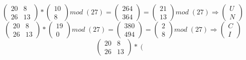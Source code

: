 \documentclass{article}
\begin{document}
\begin{enumerate}
\begin{equation*}
    \left(
    \begin{array}{cc}
    20 & 8 \\
    26 & 13
    \end{array}
    \right) *
    \left(
    \begin{array}{c}
    10\\
    8
    \end{array}
    \right) mod \;(27) = \left(
    \begin{array}{c}
    264\\
    364
    \end{array}
    \right) = \left(
    \begin{array}{c}
    21 \\
    13
    \end{array}
    \right) mod \;(27) \Rightarrow \left(
    \begin{array}{c}
    U\\
    N
    \end{array}
    \right)
\end{equation*}
\begin{equation*}
    \left(
    \begin{array}{cc}
    20 & 8 \\
    26 & 13
    \end{array}
    \right) *
    \left(
    \begin{array}{c}
    19\\
    0
    \end{array}
    \right) mod \;(27) = \left(
    \begin{array}{c}
    380\\
    494
    \end{array}
    \right) = \left(
    \begin{array}{c}
    2 \\
    8
    \end{array}
    \right) mod \; (27) \Rightarrow \left(
    \begin{array}{c}
    C\\
    I
    \end{array}
    \right)
\end{equation*}
\begin{equation*}
    \left(
    \begin{array}{cc}
    20 & 8 \\
    26 & 13
    \end{array}
    \right) *
    \left(
    \begin{array}{c}

\end{array}
\end{equation*}
\end{enumerate}
\end{document}
